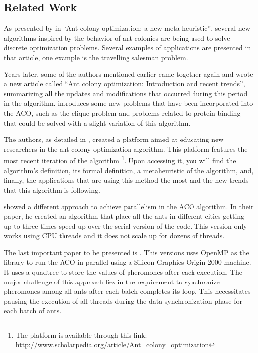 \subsection{Related Work}


As presented by \cite{ACONewAlgorithm} in ``Ant colony optimization: a new meta-heuristic'', several
new algorithms inspired by the behavior of ant colonies are being used
to solve discrete optimization problems. Several
examples of applications are presented in that article, one example is
the travelling salesman problem.

Years later, some of the authors mentioned earlier came together again and
wrote a new article called ``Ant colony optimization: Introduction and recent trends'', summarizing all the updates
and modifications that occurred during this period in the algorithm. \cite{UpdatesInACO} introduces
some new problems that have been incorporated into the ACO, such as the clique problem and problems
related to protein binding that could be solved with a slight variation of this algorithm.

The authors, as detailed in \cite{ACONewAlgorithm20anos},
created a platform aimed at educating new researchers in the ant colony optimization algorithm.
This platform features the most recent iteration of the algorithm
\footnote{The platform is available through this link: \url{http://www.scholarpedia.org/article/Ant_colony_optimization}}.
Upon accessing it, you will find the algorithm's definition, its formal definition, a metaheuristic
of the algorithm, and, finally, the applications that are using this method the most and the new trends
that this algorithm is following.

\cite{paralellAco} showed a different approach to achieve parallelism in the ACO algorithm.
In their paper, he created an algorithm that place all the ants in different
cities getting up to three times speed up over the serial version of the code. This version only works
using CPU threads and it does not scale up for dozens of threads.

The last important paper to be presented is \cite{openmpAco}. This versions uses OpenMP as the library
to run the ACO in parallel using a Silicon Graphics Origin 2000 machine.
It uses a quadtree to store the values of pheromones after each execution.
The major challenge of this approach lies in the requirement to synchronize
pheromones among all ants after each batch completes its loop. This necessitates pausing the
execution of all threads during the data synchronization phase for each batch of ants.
